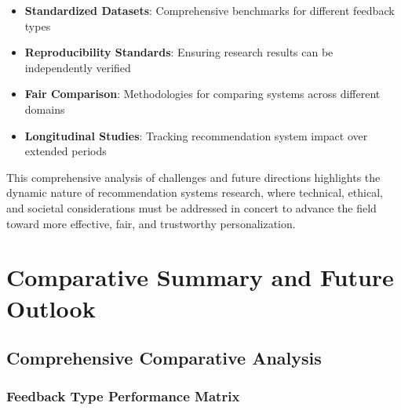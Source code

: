 \documentclass[acmsmall,review,anonymous]{acmart}
\begin{document}
\begin{itemize}
    \item \textbf{Standardized Datasets}: Comprehensive benchmarks for different feedback types
    \item \textbf{Reproducibility Standards}: Ensuring research results can be independently verified
    \item \textbf{Fair Comparison}: Methodologies for comparing systems across different domains
    \item \textbf{Longitudinal Studies}: Tracking recommendation system impact over extended periods
\end{itemize}

This comprehensive analysis of challenges and future directions highlights the dynamic nature of recommendation systems research, where technical, ethical, and societal considerations must be addressed in concert to advance the field toward more effective, fair, and trustworthy personalization.

\section{Comparative Summary and Future Outlook}
\label{sec:summary}

\subsection{Comprehensive Comparative Analysis}

\subsubsection{Feedback Type Performance Matrix}
\end{document}
